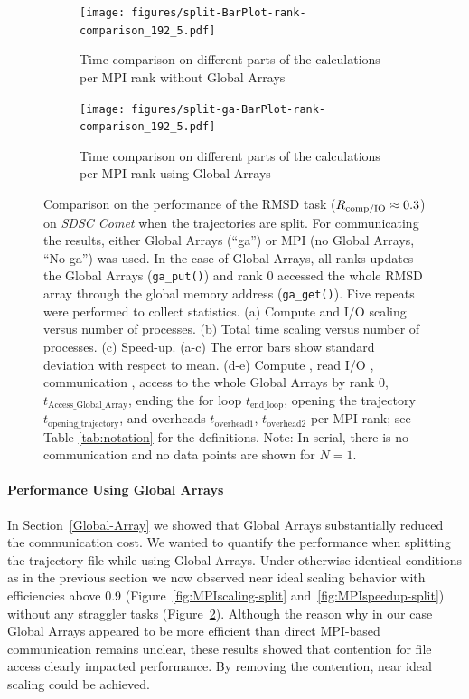 \begin{figure}[!htb]
  \begin{subfigure} {.45\textwidth}
    \texttt{[image: figures/split-BarPlot-rank-comparison\_192\_5.pdf]}
    \captionsetup{format=hang}
    \caption{Time comparison on different parts of the calculations per MPI rank without Global Arrays}
    \label{fig:MPIranks-split}
  \end{subfigure}
  \hfill
  \begin{subfigure} {.5\textwidth}
    \texttt{[image: figures/split-ga-BarPlot-rank-comparison\_192\_5.pdf]}
    \captionsetup{format=hang}
    \caption{Time comparison on different parts of the calculations per MPI rank using Global Arrays}
    \label{fig:MPIranks-split-ga}
\end{subfigure}
\caption{Comparison on the performance of the RMSD task ($R_{\text{comp/IO}} \approx 0.3$) on \emph{SDSC Comet} when the trajectories are split.
  For communicating the results, either Global Arrays (``ga'') or MPI (no Global Arrays, ``No-ga'') was used.
  In the case of Global Arrays, all ranks updates the Global Arrays (\texttt{ga\_put()}) and rank 0 accessed the whole RMSD array through the global memory address (\texttt{ga\_get()}).
  Five repeats were performed to collect statistics.
  (a) Compute and I/O scaling versus number of processes.
  (b) Total time scaling versus number of processes.
  (c) Speed-up.
  (a-c) The error bars show standard deviation with respect to mean.
  (d-e) Compute \tcomp, read I/O \tIO, communication \tcomm, access to the whole Global Arrays by rank 0, $t_{\text{Access\_Global\_Array}}$, ending the for loop $t_{\text{end\_loop}}$, opening the trajectory $t_{\text{opening\_trajectory}}$, and overheads $t_{\text{overhead1}}$, $t_{\text{overhead2}}$ per MPI rank; see Table \ref{tab:notation} for the definitions.
  Note: In serial, there is no communication and no data points are shown for $N=1$.}
\label{fig:MPIwithIO-split}
\end{figure}

\paragraph{Performance Using Global Arrays}
In Section~\ref{Global-Array} we showed that Global Arrays substantially reduced the communication cost. 
We wanted to quantify the performance when splitting the trajectory file while using Global Arrays.
Under otherwise identical conditions as in the previous section we now observed near ideal scaling behavior with efficiencies above 0.9 (Figure~\ref{fig:MPIscaling-split} and~\ref{fig:MPIspeedup-split}) without any straggler tasks (Figure~\ref{fig:MPIranks-split-ga}).
Although the reason why in our case Global Arrays appeared to be more efficient than direct MPI-based communication remains unclear, these results showed that contention for file access clearly impacted performance. By removing the contention, near ideal scaling could be achieved.

